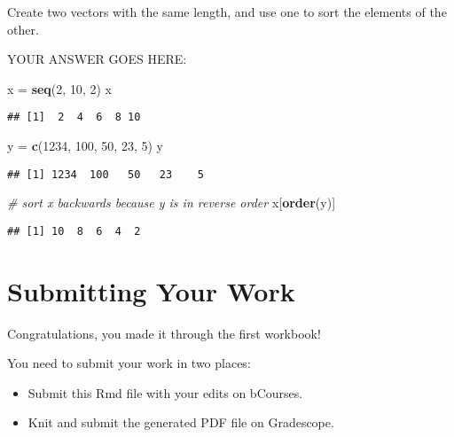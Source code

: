 \documentclass[
]{article}
\newenvironment{Shaded}{\begin{snugshade}}{\end{snugshade}}
\newcommand{\CommentTok}[1]{\textcolor[rgb]{0.56,0.35,0.01}{\textit{#1}}}
\newcommand{\DecValTok}[1]{\textcolor[rgb]{0.00,0.00,0.81}{#1}}
\newcommand{\KeywordTok}[1]{\textcolor[rgb]{0.13,0.29,0.53}{\textbf{#1}}}
\newcommand{\NormalTok}[1]{#1}
\newcommand{\StringTok}[1]{\textcolor[rgb]{0.31,0.60,0.02}{#1}}
\providecommand{\tightlist}{%
  \setlength{\itemsep}{0pt}\setlength{\parskip}{0pt}}
\begin{document}
Create two vectors with the same length, and use one to sort the
elements of the other.

YOUR ANSWER GOES HERE:

\begin{Shaded}
\begin{Highlighting}[]
\NormalTok{x =}\StringTok{ }\KeywordTok{seq}\NormalTok{(}\DecValTok{2}\NormalTok{, }\DecValTok{10}\NormalTok{, }\DecValTok{2}\NormalTok{)}
\NormalTok{x}
\end{Highlighting}
\end{Shaded}

\begin{verbatim}
## [1]  2  4  6  8 10
\end{verbatim}

\begin{Shaded}
\begin{Highlighting}[]
\NormalTok{y =}\StringTok{ }\KeywordTok{c}\NormalTok{(}\DecValTok{1234}\NormalTok{, }\DecValTok{100}\NormalTok{, }\DecValTok{50}\NormalTok{, }\DecValTok{23}\NormalTok{, }\DecValTok{5}\NormalTok{)}
\NormalTok{y}
\end{Highlighting}
\end{Shaded}

\begin{verbatim}
## [1] 1234  100   50   23    5
\end{verbatim}

\begin{Shaded}
\begin{Highlighting}[]
\CommentTok{\# sort x backwards because y is in reverse order}
\NormalTok{x[}\KeywordTok{order}\NormalTok{(y)]}
\end{Highlighting}
\end{Shaded}

\begin{verbatim}
## [1] 10  8  6  4  2
\end{verbatim}

\hypertarget{submitting-your-work}{%
\section{Submitting Your Work}\label{submitting-your-work}}

Congratulations, you made it through the first workbook!

You need to submit your work in two places:

\begin{itemize}
\tightlist
\item
  Submit this Rmd file with your edits on bCourses.
\item
  Knit and submit the generated PDF file on Gradescope.
\end{itemize}
\end{document}
